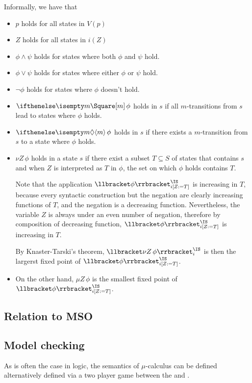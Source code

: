 Informally, we have that
\begin{itemize}
    \item $p$ holds for all states in $V(p)$
    \item $Z$ holds for all states in $i(Z)$
    \item $\phi \wedge \psi$ holds for states where both $\phi$ and $\psi$ hold.
    \item $\phi \vee \psi$ holds for states where either $\phi$ or $\psi$ hold.
    \item $\neg \phi$ holds for states where $\phi$ doesn't hold.
    \item $\boite m \phi$ holds in $s$ if all $m$-transitions from $s$ lead to states where $\phi$ holds.
    \item $\diam m \phi$ holds in $s$ if there exists a $m$-transition from $s$ to a state where $\phi$ holds.
    \item $\nu Z \, \phi$ holds in a state $s$
        if there exist a subset $T \subseteq S$ of states
        that contains $s$ and when $Z$ is interpreted as $T$
        in $\phi$, the set on which $\phi$ holds contains $T$.

        Note that the application
        $\Meaning{\phi}^\IS_{i[Z := T]}$ is increasing in $T$,
        because every syntactic construction but the negation are clearly
        increasing functions of $T$, and the negation is a decreasing
        function. Nevertheless, the variable $Z$ is always under an even number of
        negation, therefore by composition of decreasing function,
        $\Meaning{\phi}^\IS_{i[Z := T]}$ is increasing in $T$.

        By Knaster-Tarski's theorem, $\Meaning{\nu Z\, \phi}^\IS_i$
        is then the largerst fixed point of $\Meaning{\phi}^\IS_{i[Z := T]}$.
    \item On the other hand, $\mu Z \, \phi$ is the smallest fixed point
        of $\Meaning{\phi}^\IS_{i[Z := T]}$.
\end{itemize}

\subsection{Relation to MSO}
\subsection{Model checking}

As is often the case in logic,
the semantics of $\mu$-calculus can
be defined alternatively defined via a two player game
between the \Verifier and \Falsifier.


